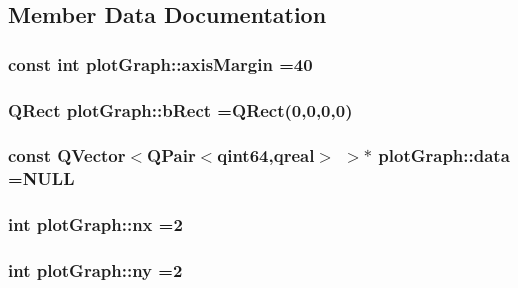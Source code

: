 \subsection{Member Data Documentation}
\hypertarget{classplot_graph_addb0f7d6a06ae97184b3013cccb6f456}{
\subsubsection[{axis\-Margin}]{\setlength{\rightskip}{0pt plus 5cm}const int plot\-Graph\-::axis\-Margin =40\hspace{0.3cm}{\ttfamily [private]}}}\label{classplot_graph_addb0f7d6a06ae97184b3013cccb6f456}
\hypertarget{classplot_graph_a82ade58d0ea960ec8c13bb3e0b084b8a}{
\subsubsection[{b\-Rect}]{\setlength{\rightskip}{0pt plus 5cm}Q\-Rect plot\-Graph\-::b\-Rect =Q\-Rect(0,0,0,0)\hspace{0.3cm}{\ttfamily [private]}}}\label{classplot_graph_a82ade58d0ea960ec8c13bb3e0b084b8a}
\hypertarget{classplot_graph_af219b9987999a1b1c2b9af03a6cb93d1}{
\subsubsection[{data}]{\setlength{\rightskip}{0pt plus 5cm}const Q\-Vector$<$Q\-Pair$<$qint64,qreal$>$ $>$$\ast$ plot\-Graph\-::data =N\-U\-L\-L\hspace{0.3cm}{\ttfamily [private]}}}\label{classplot_graph_af219b9987999a1b1c2b9af03a6cb93d1}
\hypertarget{classplot_graph_adb0cd0f56da1aa52084da70231c92255}{
\subsubsection[{nx}]{\setlength{\rightskip}{0pt plus 5cm}int plot\-Graph\-::nx =2\hspace{0.3cm}{\ttfamily [private]}}}\label{classplot_graph_adb0cd0f56da1aa52084da70231c92255}
\hypertarget{classplot_graph_a1f6efb75c6de2d3da038666610df3aca}{
\subsubsection[{ny}]{\setlength{\rightskip}{0pt plus 5cm}int plot\-Graph\-::ny =2\hspace{0.3cm}{\ttfamily [private]}}}\label{classplot_graph_a1f6efb75c6de2d3da038666610df3aca}
